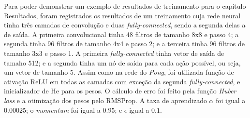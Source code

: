 Para poder demonstrar um exemplo de resultados de treinamento para o capítulo \hyperref[cap:resultados]{Resultados}, foram registrados os resultados de um treinamento cuja rede neural tinha três camadas de convolução e duas \textit{fully-connected}, sendo a segunda delas a de saída.
A primeira convolucional tinha 48 filtros de tamanho 8x8 e passo 4; a segunda tinha 96 filtros de tamanho 4x4 e passo 2; e a terceira tinha 96 filtros de tamanho 3x3 e passo 1.
A primeira \textit{fully-connected} tinha vetor de saída de tamaho 512; e a segunda tinha um nó de saída para cada ação possível, ou seja, um vetor de tamanho 5.
Assim como na rede do \textit{Pong}, foi utilizada função de ativação ReLU em todas as camadas com exceção da segunda \textit{fully-connected}, e inicializador de He para os pesos.
O cálculo de erro foi feito pela função \textit{Huber loss} e a otimização dos pesos pelo RMSProp.
A taxa de aprendizado $\alpha$ foi igual a $0.00025$;
o \textit{momentum} foi igual a $0.95$;
e $\epsilon$ igual a $0.1$.


